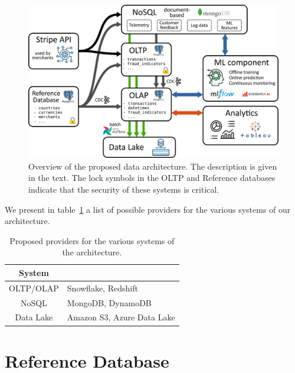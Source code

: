\documentclass[11pt,a4paper,computermodern]{article}
\begin{document}
\begin{figure}[!htb]
	\centering
	\includegraphics[scale=0.93]{./figures/architecture}
	\caption{Overview of the proposed data architecture. The description is given in the text. The lock symbols in the OLTP and Reference databases indicate that the security of these systems is critical.}
	\label{fig:architecture}
\end{figure}


We present in table~\ref{table:providers} a list of possible providers for the various systems of our architecture.

\begin{table}[!htb]
	\centering
	\begin{threeparttable}
		\caption{Proposed providers for the various systems of the architecture.}
		\label{table:providers}
		\begin{tabularx}{0.6\textwidth}{c >{\centering\arraybackslash}X}
			\toprule
			\multicolumn{1}{c}{\textbf{System}} & \multicolumn{1}{c}{\textbf{Provider}} \\
			\midrule
			OLTP/OLAP & Snowflake, Redshift \\
			NoSQL & MongoDB, DynamoDB \\
			Data Lake & Amazon S3, Azure Data Lake \\
			\bottomrule
		\end{tabularx}
	\end{threeparttable}
\end{table}



\clearpage
\section*{Reference Database}
\end{document}
